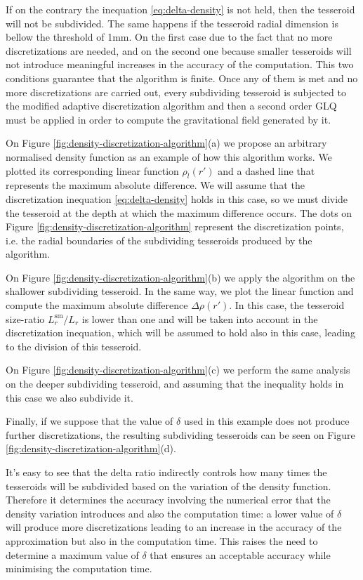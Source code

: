 \documentclass[extra]{gji}
\begin{document}
If on the contrary the inequation \ref{eq:delta-density} is not held, 
then the tesseroid will not be subdivided.
The same happens if the tesseroid radial dimension is bellow the 
threshold of 1mm.
On the first case due to the fact that no more discretizations are 
needed, and on the second one because smaller tesseroids will not 
introduce meaningful increases in the accuracy of the computation.
This two conditions guarantee that the algorithm is finite.
Once any of them is met and no more discretizations are carried out, 
every subdividing tesseroid is subjected to the modified adaptive 
discretization algorithm and then a second order GLQ must be applied in 
order to compute the gravitational field generated by it.

On Figure \ref{fig:density-discretization-algorithm}(a) we propose an 
arbitrary normalised density function as an example of how this 
algorithm works.
We plotted its corresponding linear function $\rho_l(r')$ and a 
dashed line that represents the maximum absolute difference.
We will assume that the discretization inequation 
\ref{eq:delta-density} holds in this case, so we must divide the 
tesseroid at the depth at which the maximum difference occurs.
The dots on Figure \ref{fig:density-discretization-algorithm} 
represent the discretization points, i.e. the radial boundaries of the 
subdividing tesseroids produced by the algorithm.

On Figure \ref{fig:density-discretization-algorithm}(b) we apply the 
algorithm on the shallower subdividing tesseroid.
In the same way, we plot the linear function and compute the maximum 
absolute difference $\Delta \rho (r')$.
In this case, the tesseroid size-ratio $L_r^\text{sm}/L_r$ is lower 
than one and will be taken into account in the discretization 
inequation, which will be assumed to hold also in this case, leading to 
the division of this tesseroid.

On Figure \ref{fig:density-discretization-algorithm}(c) we perform the 
same analysis on the deeper subdividing tesseroid, and assuming that the 
inequality holds in this case we also subdivide it.

Finally, if we suppose that the value of $\delta$ used in this example 
does not produce further discretizations, the resulting subdividing 
tesseroids can be seen on Figure 
\ref{fig:density-discretization-algorithm}(d).

It's easy to see that the delta ratio indirectly controls how many 
times the tesseroids will be subdivided based on the variation of the 
density function.
Therefore it determines the accuracy involving the numerical error that 
the density variation introduces and also the computation time: a lower 
value of $\delta$ will produce more discretizations leading to an 
increase in the accuracy of the approximation but also in the 
computation time.
This raises the need to determine a maximum value of $\delta$ that 
ensures an acceptable accuracy while minimising the computation time.
\end{document}
